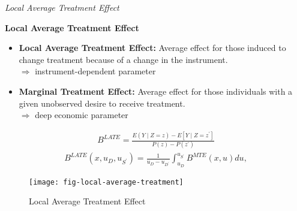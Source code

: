 \begin{frame}\begin{center}
		\LARGE\textit{Local Average Treatment Effect}
\end{center}\end{frame}
\begin{frame}
	\textbf{Local Average Treatment Effect}\vspace{0.3cm}
	\begin{itemize}\setlength\itemsep{1em}
		\item \textbf{Local Average Treatment Effect:} Average effect for those induced
		to change treatment because of a change in the instrument.\\\vspace{0.2cm}
		\(\Rightarrow\) instrument-dependent parameter\vspace{0.4cm}

		\item \textbf{Marginal Treatment Effect:} Average effect for those individuals
		with a given unobserved desire to receive treatment.\\\vspace{0.2cm}
		\(\Rightarrow\) deep economic parameter
	\end{itemize}
\end{frame}
\begin{frame}
	\begin{align*}
		B^{LATE} = \frac{E(Y\mid Z = z) - E[Y \mid Z = z^\prime]}{P(z) - P(z^\prime)}
	\end{align*}
	\begin{align*}
		B^{LATE}(x, u_D, u_{S^\prime}) = \frac{1}{u_D - u_{D^\prime}} \int_{u_D}^{u_{S^\prime}} B^{MTE}(x, u) du,
	\end{align*}
\end{frame}
\begin{frame}
	\begin{figure}[htp]\centering
		\caption{Local Average Treatment Effect}\label{Local Average Treatment}\scalebox{0.35}
		{\texttt{[image: fig-local-average-treatment]}}
	\end{figure}
\end{frame}

